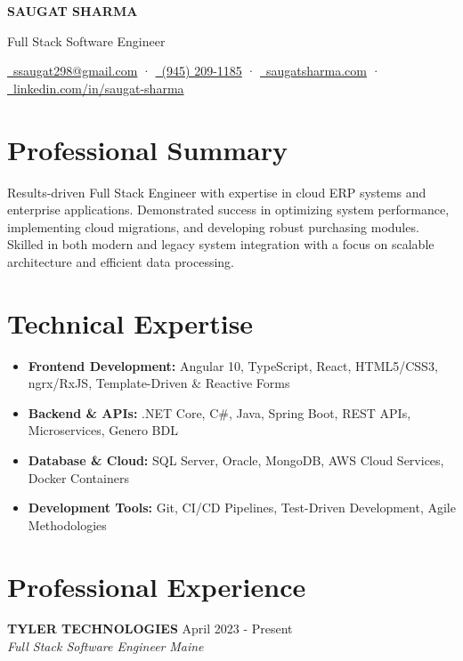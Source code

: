 \documentclass[11pt,letterpaper]{article}
\begin{document}
\begin{center}
    {\LARGE\bfseries\color{sectioncolor} SAUGAT SHARMA}

    \vspace{0.2em}
    {\Large\color{sectioncolor} Full Stack Software Engineer}

    \vspace{0.2em}
    {\color{linkcolor}
        \href{mailto:ssaugat298@gmail.com}{\faEnvelope\ ssaugat298@gmail.com} 
        · \href{tel:+19452091185}{\faPhone\ (945) 209-1185} 
        · \href{https://saugatsharma.com}{\faGlobe\ saugatsharma.com} 
        · \href{https://linkedin.com/in/saugat-sharma}{\faLinkedin\ linkedin.com/in/saugat-sharma}
    }
\end{center}

\section{Professional Summary}
Results-driven Full Stack Engineer with expertise in cloud ERP systems and enterprise applications. Demonstrated success in optimizing system performance, implementing cloud migrations, and developing robust purchasing modules. Skilled in both modern and legacy system integration with a focus on scalable architecture and efficient data processing.

\section{Technical Expertise}
\begin{itemize}
    \item \textbf{Frontend Development:} Angular 10, TypeScript, React, HTML5/CSS3, ngrx/RxJS, Template-Driven \& Reactive Forms
    \item \textbf{Backend \& APIs:} .NET Core, C\#, Java, Spring Boot, REST APIs, Microservices, Genero BDL
    \item \textbf{Database \& Cloud:} SQL Server, Oracle, MongoDB, AWS Cloud Services, Docker Containers
    \item \textbf{Development Tools:} Git, CI/CD Pipelines, Test-Driven Development, Agile Methodologies
\end{itemize}

\section{Professional Experience}
\noindent\textbf{\large\color{sectioncolor} TYLER TECHNOLOGIES} \hfill{\color{datecolor} April 2023 - Present}\\
\textit{Full Stack Software Engineer} \hfill \textit{Maine}
\end{document}
